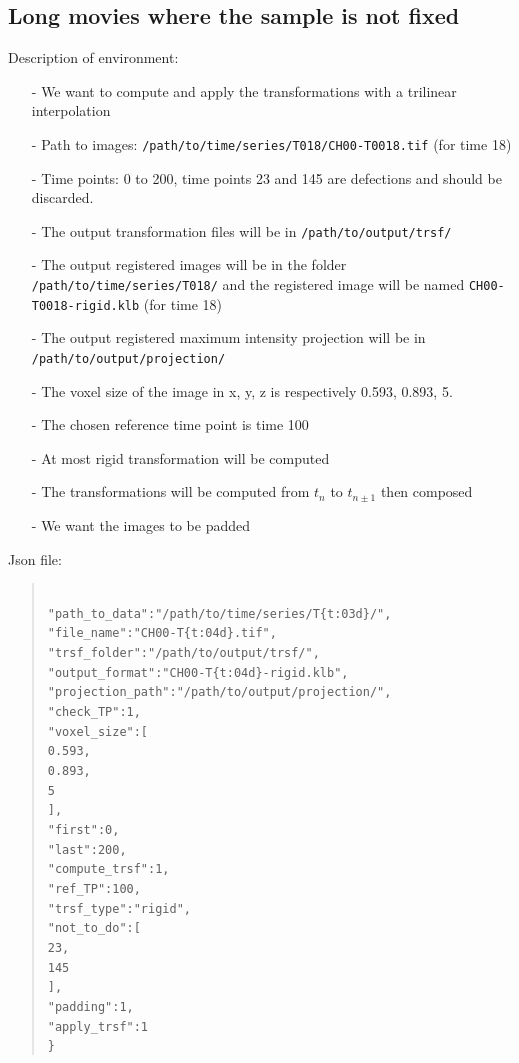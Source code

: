 \documentclass[10pt,a4paper]{article}
\newcommand\tab[1][.6cm]{\hspace*{#1}}
\newenvironment{code}[1]{\mbox{}\\[1ex]\hspace*{-#1cm}\begin{minipage}{150mm}\begin{quote}\tt}{\end{quote}\end{minipage}\mbox{}\\[1ex]}
\begin{document}
\subsection{Long movies where the sample is not fixed}
Description of environment:
\begin{itemize}
\item[-] We want to compute and apply the transformations with a trilinear interpolation
\item[-] Path to images: \texttt{/path/to/time/series/T018/CH00-T0018.tif} (for time 18)
\item[-] Time points: 0 to 200, time points 23 and 145 are defections and should be discarded.
\item[-] The output transformation files will be in \texttt{/path/to/output/trsf/}
\item[-] The output registered images will be in the folder \texttt{/path/to/time/series/T018/} and the registered image will be named \texttt{CH00-T0018-rigid.klb} (for time 18)
\item[-] The output registered maximum intensity projection will be in \texttt{/path/to/output/projection/}
\item[-] The voxel size of the image in x, y, z is respectively 0.593, 0.893, 5.
\item[-] The chosen reference time point is time 100
\item[-] At most rigid transformation will be computed
\item[-] The transformations will be computed from $t_n$ to $t_{n\pm 1}$ then composed
\item[-] We want the images to be padded
\end{itemize}
Json file:
\begin{code}{0.8}
\{\\
\tab"path\_to\_data":"/path/to/time/series/T\{t:03d\}/",\\
\tab"file\_name":"CH00-T\{t:04d\}.tif",\\
\tab"trsf\_folder":"/path/to/output/trsf/",\\
\tab"output\_format":"CH00-T\{t:04d\}-rigid.klb",\\
\tab"projection\_path":"/path/to/output/projection/",\\
\tab"check\_TP":1,\\
\tab"voxel\_size":[\\
\tab\tab0.593,\\
\tab\tab0.893,\\
\tab\tab5\\
\tab],\\
\tab"first":0,\\
\tab"last":200,\\
\tab"compute\_trsf":1,\\
\tab"ref\_TP":100,\\
\tab"trsf\_type":"rigid",\\
\tab"not\_to\_do":[\\
\tab\tab23,\\
\tab\tab145\\
\tab],\\
\tab"padding":1,\\
\tab"apply\_trsf":1\\
\}
\end{code}
\end{document}
